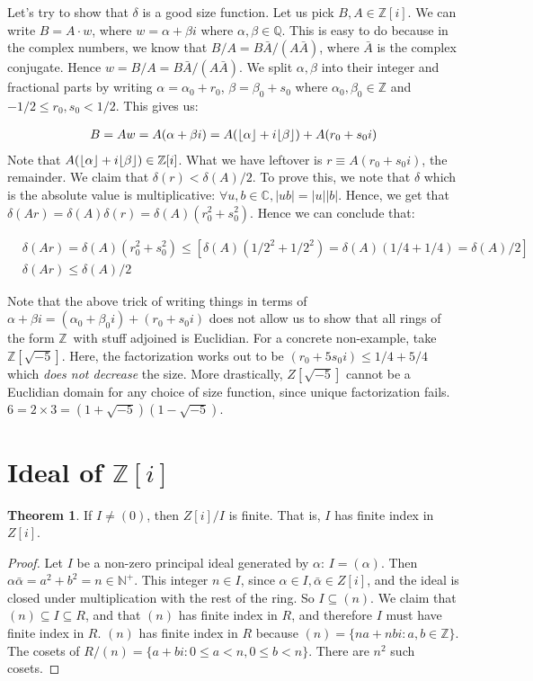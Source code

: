 \documentclass{book}
\newcommand{\N}{\ensuremath{\mathbb{N}}}
\newcommand{\Z}{\ensuremath{\mathbb{Z}}}
\newcommand{\Q}{\ensuremath{\mathbb{Q}}}
\newcommand{\C}{\ensuremath{\mathbb{C}}}
\DeclarePairedDelimiter\floor{\lfloor}{\rfloor}
\theoremstyle{definition}
\newtheorem{theorem}{Theorem}
\begin{document}
Let's try to show that $\delta$ is a good size function. Let us pick $B, A \in \Z[i]$.
We can write $B = A \cdot w$, where $w = \alpha + \beta i$ where $\alpha, \beta \in \Q$.
This is easy to do because in the complex numbers, we know that $B/A = B\bar{A}/(A\bar{A})$,
where $\bar A$ is the complex conjugate.  Hence $w = B/A = B\bar{A}/(A\bar{A})$.
We split $\alpha, \beta$ into their integer and fractional parts by
writing $\alpha = \alpha_0 + r_0$, $\beta = \beta_0 + s_0$ where
$\alpha_0, \beta_0 \in \Z$ and $-1/2 \leq r_0, s_0 < 1/2$. This gives us:

\begin{align*}
B = Aw = A(\alpha + \beta i) = A(\floor{\alpha} + i \floor \beta) + A(r_0 + s_0 i) \\
\end{align*}
Note that $A(\floor{\alpha} + i \floor \beta) \in \Z[i]$. What
we have leftover is $r \equiv A(r_0 + s_0 i)$, the remainder. 
We claim that $\delta(r) < \delta(A)/2$. To prove this, we note that $\delta$
which is the absolute value is multiplicative: $\forall u, b \in \C, |ub| = |u||b|$.
Hence, we get that $\delta(Ar) = \delta(A)\delta(r) = \delta(A)(r_0^2 + s_0^2)$.
Hence we can conclude that:

\begin{align*}
& \delta(Ar) = \delta(A)(r_0^2 + s_0^2) \leq \left[ \delta(A)(1/2^2 + 1/2^2) = \delta(A)(1/4 + 1/4) = \delta(A)/2 \right] \\
& \delta(Ar) \leq \delta(A)/2
\end{align*}

Note that the above trick of writing things in terms of $\alpha + \beta i = (\alpha_0 + \beta_0 i) + (r_0 + s_0i)$
does not allow us to show that all rings of the form \Z~with stuff adjoined is Euclidian. For
a concrete non-example, take $\Z[\sqrt{-5}]$. Here, the factorization works
out to be $(r_0 + 5 s_0 i) \leq 1/4 + 5/4$ which \emph{does not decrease} the
size. More drastically, $Z[\sqrt{-5}]$ cannot be a Euclidian domain for any
choice of size function, since unique factorization fails. $6 = 2 \times 3 = (1+ \sqrt{-5})(1-\sqrt{-5})$.

\section{Ideal of $\Z[i]$}

\begin{theorem}
If $I \neq (0)$, then $Z[i]/I$ is finite. That is, $I$ has finite index in $Z[i]$.
\end{theorem}
\begin{proof}
Let $I$ be a non-zero principal ideal generated by $\alpha$: 
$I = (\alpha)$. Then $\alpha \bar \alpha = a^2 + b^2 = n \in \N^+$.
This integer $n \in I$, since $\alpha \in I, \bar \alpha \in Z[i]$, and the ideal
is closed under multiplication with the rest of the ring. So $I \subseteq (n)$.
We claim that $(n) \subseteq I \subseteq R$, and that $(n)$ has finite index
in $R$, and therefore $I$ must have finite index in $R$. $(n)$ has finite
index in $R$ because $(n) = \{ n a + n b i : a, b \in \Z \}$. The cosets
of $R/(n) = \{ a + bi : 0 \leq a < n, 0 \leq b < n \}$. There are $n^2$ such
cosets.
\end{proof}
\end{document}
